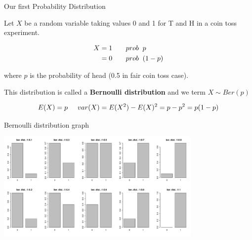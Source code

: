 \documentclass{beamer}\usepackage[]{graphicx}\usepackage[]{color}
\begin{document}
\begin{frame}[fragile]{Our first Probability Distribution \;\;}

Let $X$ be a random variable taking values 0 and 1 for T and H in a coin toss experiment. \pause \newline

\begin{align}
X & = 1 \hspace{0.5 cm}  \;\; prob \;\; p \\
  & = 0 \hspace{0.5 cm}  \;\;prob \;\; (1-p) \\
\end{align}

where $p$ is the probability of head (0.5 in fair coin toss case).\pause \newline

This distribution is called a \textbf{Bernoulli distribution} and we term
$ X \sim Ber(p) $

$$ E(X) = p \hspace{0.5 cm} var(X) = E(X^2) - E(X)^2 = p - p^2 = p(1-p) $$

\end{frame}


\begin{frame}[fragile]{Bernoulli distribution graph \;\;}


\includegraphics[width=10cm,keepaspectratio]{bernoulli_plots.pdf}

\end{frame}
\end{document}
